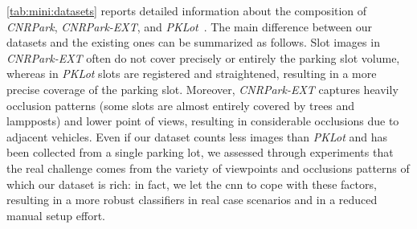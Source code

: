 \ref{tab:mini:datasets} reports detailed information about the composition of \emph{CNRPark}, \emph{CNRPark-EXT}, and \emph{PKLot}~\cite{de2015pklot}.
The main difference between our datasets and the existing ones can be summarized as follows.
Slot images in \emph{CNRPark-EXT} often do not cover precisely or entirely the parking slot volume, whereas in \emph{PKLot} slots are registered and straightened, resulting in a more precise coverage of the parking slot.
Moreover, \emph{CNRPark-EXT} captures heavily occlusion patterns (some slots are almost entirely covered by trees and lampposts) and lower point of views, resulting in considerable occlusions due to adjacent vehicles.
Even if our dataset counts less images than \emph{PKLot} and has been collected from a single parking lot, we assessed through experiments that the real challenge comes from the variety of viewpoints and occlusions patterns of which our dataset is rich:
in fact, we let the \gls{cnn} to cope with these factors, resulting in a more robust classifiers in real case scenarios and in a reduced manual setup effort.

